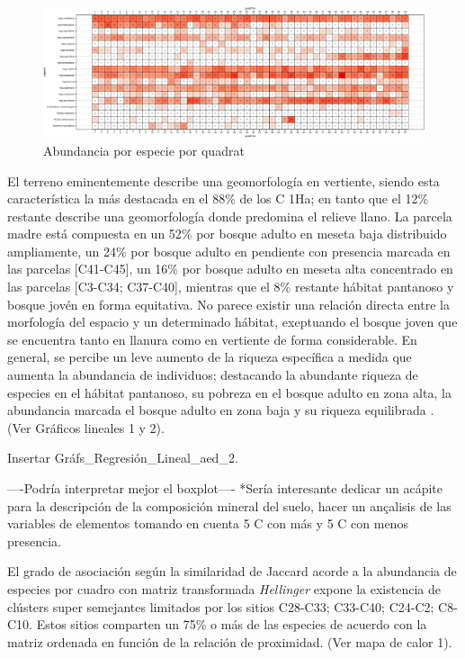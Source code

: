 \documentclass[11pt,]{article}
\begin{document}
\begin{figure}
\centering
\includegraphics{manuscrito_files/figure-latex/unnamed-chunk-3-1.pdf}
\caption{\label{fig:abun_sp_q}Abundancia por especie por quadrat}
\end{figure}

El terreno eminentemente describe una geomorfología en vertiente, siendo
esta característica la más destacada en el 88\% de los C 1Ha; en tanto
que el 12\% restante describe una geomorfología donde predomina el
relieve llano. La parcela madre está compuesta en un 52\% por bosque
adulto en meseta baja distribuido ampliamente, un 24\% por bosque adulto
en pendiente con presencia marcada en las parcelas {[}C41-C45{]}, un
16\% por bosque adulto en meseta alta concentrado en las parcelas
{[}C3-C34; C37-C40{]}, mientras que el 8\% restante hábitat pantanoso y
bosque jovén en forma equitativa. No parece existir una relación directa
entre la morfología del espacio y un determinado hábitat, exeptuando el
bosque joven que se encuentra tanto en llanura como en vertiente de
forma considerable. En general, se percibe un leve aumento de la riqueza
específica a medida que aumenta la abundancia de individuos; destacando
la abundante riqueza de especies en el hábitat pantanoso, su pobreza en
el bosque adulto en zona alta, la abundancia marcada el bosque adulto en
zona baja y su riqueza equilibrada . (Ver Gráficos lineales 1 y 2).

Insertar Gráfs\_Regresión\_Lineal\_aed\_2.

----Podría interpretar mejor el boxplot---- *Sería interesante dedicar
un acápite para la descripción de la composición mineral del suelo,
hacer un ançalisis de las variables de elementos tomando en cuenta 5 C
con más y 5 C con menos presencia.

El grado de asociación según la similaridad de Jaccard acorde a la
abundancia de especies por cuadro con matriz transformada
\emph{Hellinger} expone la existencia de clústers super semejantes
limitados por los sitios C28-C33; C33-C40; C24-C2; C8-C10. Estos sitios
comparten un 75\% o más de las especies de acuerdo con la matriz
ordenada en función de la relación de proximidad. (Ver mapa de calor 1).
\end{document}
